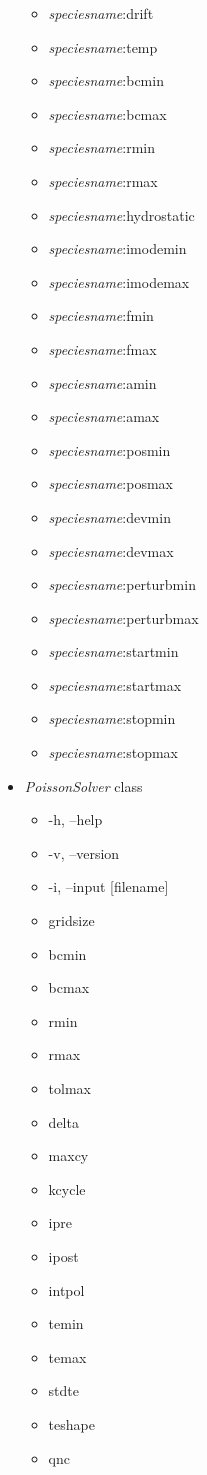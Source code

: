 \documentclass[10pt,a4paper]{article}
\begin{document}
\begin{itemize}
\begin{itemize}
	\item \emph{speciesname}:drift
	\item \emph{speciesname}:temp
	\item \emph{speciesname}:bcmin
	\item \emph{speciesname}:bcmax
	\item \emph{speciesname}:rmin
	\item \emph{speciesname}:rmax
	\item \emph{speciesname}:hydrostatic
	\item \emph{speciesname}:imodemin
	\item \emph{speciesname}:imodemax
	\item \emph{speciesname}:fmin
	\item \emph{speciesname}:fmax
	\item \emph{speciesname}:amin
	\item \emph{speciesname}:amax
	\item \emph{speciesname}:posmin
	\item \emph{speciesname}:posmax
	\item \emph{speciesname}:devmin
	\item \emph{speciesname}:devmax
	\item \emph{speciesname}:perturbmin
	\item \emph{speciesname}:perturbmax
	\item \emph{speciesname}:startmin
	\item \emph{speciesname}:startmax
	\item \emph{speciesname}:stopmin
	\item \emph{speciesname}:stopmax
	\end{itemize}
\item \emph{PoissonSolver} class
	\begin{itemize}
	\item -h, --help
	\item -v, --version
	\item -i, --input [filename]
	\item gridsize
	\item bcmin
	\item bcmax
	\item rmin
	\item rmax
	\item tolmax
	\item delta
	\item maxcy
	\item kcycle
	\item ipre
	\item ipost
	\item intpol
	\item temin
	\item temax
	\item stdte
	\item teshape
	\item qnc
	\end{itemize}
\end{itemize}
\end{document}
